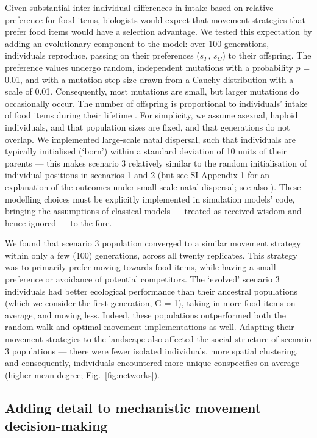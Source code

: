 Given substantial inter-individual differences in intake based on relative preference for food items, biologists would expect that movement strategies that prefer food items would have a selection advantage.
We tested this expectation by adding an evolutionary component to the model: over 100 generations, individuals reproduce, passing on their preferences ($s_F$, $s_C$) to their offspring.
The preference values undergo random, independent mutations with a probability $p$ = 0.01, and with a mutation step size drawn from a Cauchy distribution with a scale of 0.01.
Consequently, most mutations are small, but larger mutations do occasionally occur.
The number of offspring is proportional to individuals' intake of food items during their lifetime \citep{netz2021,gupte2021a,gupte2022c}.
For simplicity, we assume asexual, haploid individuals, and that population sizes are fixed, and that generations do not overlap.
We implemented large-scale natal dispersal, such that individuals are typically initialised (`born') within a standard deviation of 10 units of their parents --- this makes scenario 3 relatively similar to the random initialisation of individual positions in scenarios 1 and 2 (but see SI Appendix 1 for an explanation of the outcomes under small-scale natal dispersal; see also \cite{gupte2021a,gupte2022c}).
These modelling choices must be explicitly implemented in simulation models' code, bringing the assumptions of classical models --- treated as received wisdom and hence ignored --- to the fore.

We found that scenario 3 population converged to a similar movement strategy within only a few (100) generations, across all twenty replicates.
This strategy was to primarily prefer moving towards food items, while having a small preference or avoidance of potential competitors.
The `evolved' scenario 3 individuals had better ecological performance than their ancestral populations (which we consider the first generation, G = 1), taking in more food items on average, and moving less.
Indeed, these populations outperformed both the random walk and optimal movement implementations as well.
Adapting their movement strategies to the landscape also affected the social structure of scenario 3 populations --- there were fewer isolated individuals, more spatial clustering, and consequently, individuals encountered more unique conspecifics on average (higher mean degree; Fig.~\ref{fig:networks}).

\subsection*{Adding detail to mechanistic movement decision-making}


